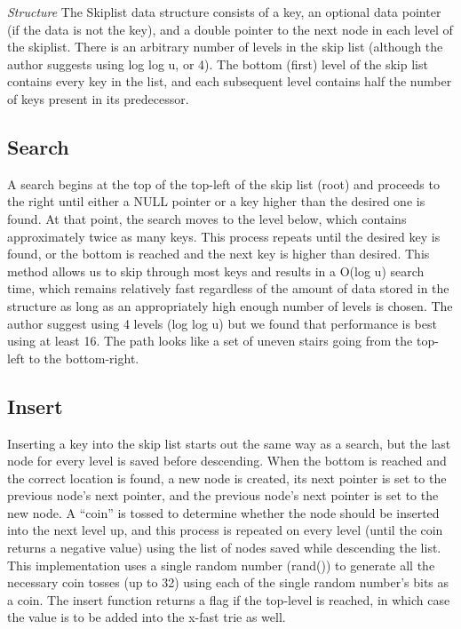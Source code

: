 \documentclass[10pt,twocolumn]{article}
\begin{document}
	
\emph{Structure} The Skiplist data structure consists of a key, an optional data pointer (if the data is not the key), and a double pointer to the next node in each level of the skiplist. There is an arbitrary number of levels in the skip list (although the author suggests using log log u, or 4). The bottom (first) level of the skip list contains every key in the list, and each subsequent level contains half the number of keys present in its predecessor.
	
\subsection{Search}
	A search begins at the top of the top-left of the skip list (root) and proceeds to the right until either a NULL pointer or a key higher than the desired one is found. At that point, the search moves to the level below, which contains approximately twice as many keys. This process repeats until the desired key is found, or the bottom is reached and the next key is higher than desired. This method allows us to skip through most keys and results in a O(log u) search time, which remains relatively fast regardless of the amount of data stored in the structure as long as an appropriately high enough number of levels is chosen. The author suggest using 4 levels (log log u) but we found that performance is best using at least 16. The path looks like a set of uneven stairs going from the top-left to the bottom-right.
	
\subsection{Insert}
	Inserting a key into the skip list starts out the same way as a search, but the last node for every level is saved before descending. When the bottom is reached and the correct location is found, a new node is created, its next pointer is set to the previous node’s next pointer, and the previous node’s next pointer is set to the new node. A “coin” is tossed to determine whether the node should be inserted into the next level up, and this process is repeated on every level (until the coin returns a negative value) using the list of nodes saved while descending the list. This implementation uses a single random number (rand()) to generate all the necessary coin tosses (up to 32) using each of the single random number’s bits as a coin. The insert function returns a flag if the top-level is reached, in which case the value is to be added into the x-fast trie as well.
\end{document}
